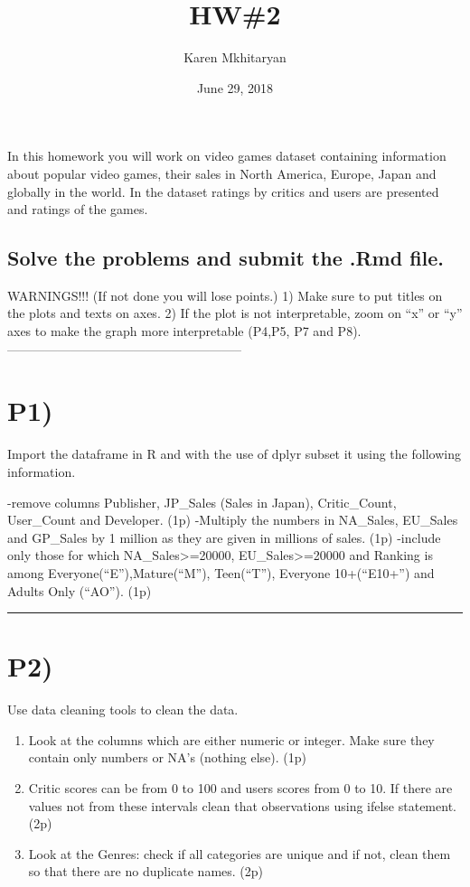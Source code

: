 \documentclass[]{article}
\title{HW\#2}
\author{Karen Mkhitaryan}
\date{June 29, 2018}
\providecommand{\tightlist}{%
  \setlength{\itemsep}{0pt}\setlength{\parskip}{0pt}}
\begin{document}
\maketitle

In this homework you will work on video games dataset containing
information about popular video games, their sales in North America,
Europe, Japan and globally in the world. In the dataset ratings by
critics and users are presented and ratings of the games.

\subsection{Solve the problems and submit the .Rmd
file.}\label{solve-the-problems-and-submit-the-.rmd-file.}

WARNINGS!!! (If not done you will lose points.) 1) Make sure to put
titles on the plots and texts on axes. 2) If the plot is not
interpretable, zoom on ``x'' or ``y'' axes to make the graph more
interpretable (P4,P5, P7 and P8).
--------------------------------------------------------

\section{P1)}\label{p1}

Import the dataframe in R and with the use of dplyr subset it using the
following information.

-remove columns Publisher, JP\_Sales (Sales in Japan), Critic\_Count,
User\_Count and Developer. (1p) -Multiply the numbers in NA\_Sales,
EU\_Sales and GP\_Sales by 1 million as they are given in millions of
sales. (1p) -include only those for which NA\_Sales\textgreater{}=20000,
EU\_Sales\textgreater{}=20000 and Ranking is among
Everyone(``E''),Mature(``M''), Teen(``T''), Everyone 10+(``E10+'') and
Adults Only (``AO''). (1p)

\begin{center}\rule{0.5\linewidth}{\linethickness}\end{center}

\section{P2)}\label{p2}

Use data cleaning tools to clean the data.

\begin{enumerate}
\def\labelenumi{(\alph{enumi})}
\tightlist
\item
  Look at the columns which are either numeric or integer. Make sure
  they contain only numbers or NA's (nothing else). (1p)
\item
  Critic scores can be from 0 to 100 and users scores from 0 to 10. If
  there are values not from these intervals clean that observations
  using ifelse statement. (2p)
\item
  Look at the Genres: check if all categories are unique and if not,
  clean them so that there are no duplicate names. (2p)
\end{enumerate}
\end{document}
